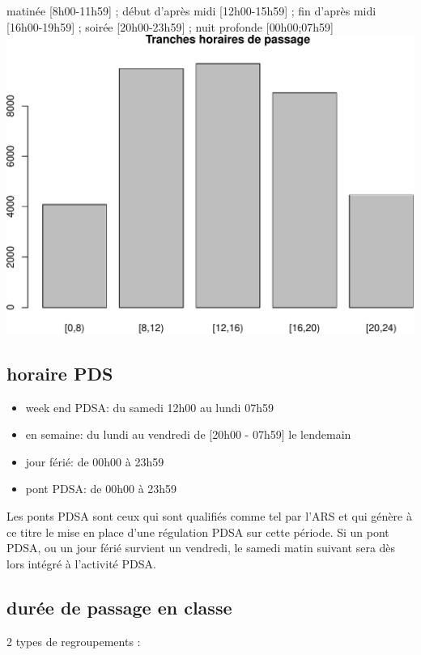\documentclass[]{article}
\begin{document}
matinée {[}8h00-11h59{]} ; début d'après midi {[}12h00-15h59{]} ; fin
d'après midi {[}16h00-19h59{]} ; soirée {[}20h00-23h59{]} ; nuit
profonde {[}00h00;07h59{]}
\includegraphics{rapport_2014_files/figure-latex/tranches_heure_entree-1.pdf}

\subsection{horaire PDS}\label{horaire-pds}

\begin{itemize}
\itemsep1pt\parskip0pt
\item
  week end PDSA: du samedi 12h00 au lundi 07h59
\item
  en semaine: du lundi au vendredi de {[}20h00 - 07h59{]} le lendemain
\item
  jour férié: de 00h00 à 23h59
\item
  pont PDSA: de 00h00 à 23h59
\end{itemize}

Les ponts PDSA sont ceux qui sont qualifiés comme tel par l'ARS et qui
génère à ce titre le mise en place d'une régulation PDSA sur cette
période. Si un pont PDSA, ou un jour férié survient un vendredi, le
samedi matin suivant sera dès lors intégré à l'activité PDSA.

\subsection{durée de passage en
classe}\label{duree-de-passage-en-classe}

2 types de regroupements :
\end{document}
